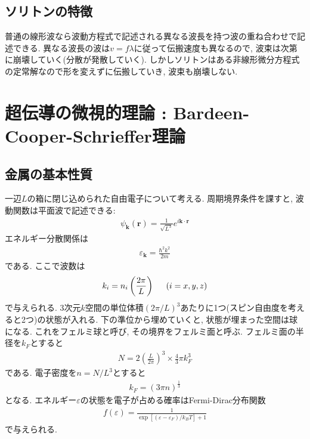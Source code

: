 \documentclass[10.5pt,a4paper]{jreport}
\begin{document}
\subsection{ソリトンの特徴}
普通の線形波なら波動方程式で記述される異なる波長を持つ波の重ね合わせで記述できる. 異なる波長の波は$v = f\lambda$に従って伝搬速度も異なるので, 波束は次第に崩壊していく(分散が発散していく). しかしソリトンはある非線形微分方程式の定常解なので形を変えずに伝搬していき, 波束も崩壊しない.
\section{超伝導の微視的理論 : Bardeen-Cooper-Schrieffer理論}
\subsection{金属の基本性質}
一辺$L$の箱に閉じ込められた自由電子について考える. 周期境界条件を課すと, 波動関数は平面波で記述できる:
\begin{eqnarray}
  \psi_{\bm{k}}(\bm{r}) = \frac{1}{\sqrt{L^3}}e^{i\bm{k}\cdot\bm{r}}
\end{eqnarray}
エネルギー分散関係は
\begin{eqnarray}
  \varepsilon_{\bm k} = \frac{\hbar^2k^2}{2m}
\end{eqnarray}
である. ここで波数は
\begin{eqnarray}
  k_i = n_i\left(\frac{2\pi}{L}\right)\hspace{0.5cm}(i= x, y, z)
\end{eqnarray}
で与えられる. 3次元$k$空間の単位体積$(2\pi/L)^3$あたりに1つ(スピン自由度を考えると2つ)の状態が入れる. 下の準位から埋めていくと, 状態が埋まった空間は球になる. これをフェルミ球と呼び, その境界をフェルミ面と呼ぶ. フェルミ面の半径を$k_F$とすると
\begin{eqnarray}
  N = 2\left(\frac{L}{2\pi}\right)^3\times\frac{4}{3}\pi k_F^3
\end{eqnarray}
である. 電子密度を$n = N/L^3$とすると
\begin{eqnarray}
  k_F = (3\pi n)^{\frac{1}{3}}
\end{eqnarray}
となる. エネルギー$\varepsilon$の状態を電子が占める確率はFermi-Dirac分布関数
\begin{eqnarray}
  f(\varepsilon) = \frac{1}{\exp[(\varepsilon- \varepsilon_F)/k_BT]+1}
\end{eqnarray}
で与えられる.
\end{document}

